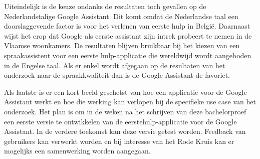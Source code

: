 Uiteindelijk is de keuze ondanks de resultaten toch gevallen op de Nederlandstalige Google Assistant. Dit komt omdat de Nederlandse taal een doorslaggevende factor is voor het verlenen van eerste hulp in België. Daarnaast wijst het erop dat Google als eerste assistant zijn intrek probeert te nemen in de Vlaamse woonkamers. De resultaten blijven bruikbaar bij het kiezen van een spraakassistent voor een eerste hulp-applicatie die wereldwijd wordt aangeboden in de Engelse taal. Als er enkel wordt afgegaan op de resultaten van het onderzoek naar de spraakkwaliteit dan is de Google Assistant de favoriet.

Als laatste is er een kort beeld geschetst van hoe een applicatie voor de Google Assistant werkt en hoe die werking kan verlopen bij de specifieke use case van het onderzoek. Het plan is om in de weken na het schrijven van deze bachelorproef een eerste versie te ontwikkelen van de eerstehulp-applicatie voor de Google Assistant. In de verdere toekomst kan deze versie getest worden. Feedback van gebruikers kan verwerkt worden en bij interesse van het Rode Kruis kan er mogelijks een samenwerking worden aangegaan.

%





\chapter*{}

